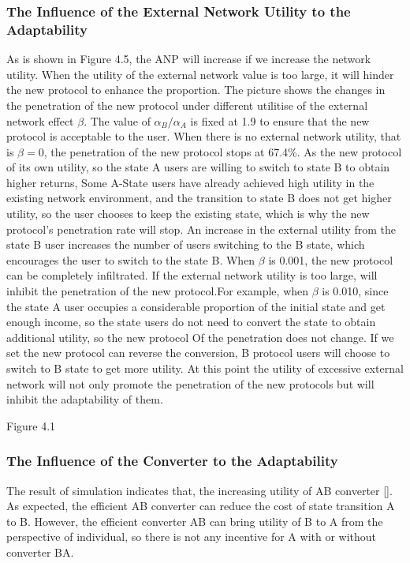 \documentclass{article}
\begin{document}
\subsubsection{The Influence of the External Network Utility to the Adaptability}
As is shown in Figure 4.5, the ANP will increase if we increase the network utility. When the utility of the external
network value is too large, it will hinder the new protocol to enhance the proportion. The picture shows the changes
in the penetration of the new protocol under different utilitise of the external network effect \(\beta\). The value of
$\alpha_{B}/\alpha_{A}$ is fixed at 1.9 to ensure that the new protocol is acceptable to the user. When there is no
external network utility, that is $\beta=0$, the penetration of the new protocol stops at 67.4\%. As the new protocol
of its own utility, so the state A users are willing to switch to state B to obtain higher returns, Some A-State users
have already achieved high utility in the existing network environment, and the transition to state B does not get higher
utility, so the user chooses to keep the existing state, which is why the new protocol's penetration rate will stop.
An increase in the external utility from the state B user increases the number of users switching to the B state, which
encourages the user to switch to the state B. When $\beta$ is 0.001, the new protocol can be completely infiltrated. If
the external network utility is too large, will inhibit the penetration of the new protocol.For example, when $\beta$ is
0.010, since the state A user occupies a considerable proportion of the initial state and get enough income, so the state
users do not need to convert the state to obtain additional utility, so the new protocol Of the penetration does not
change. If we set the new protocol can reverse the conversion, B protocol users will choose to switch to B state to get
more utility. At this point the utility of excessive external network will not only promote the penetration of the new
protocols but will inhibit the adaptability of them.

Figure 4.1

\subsubsection{The Influence of the Converter to the Adaptability}
The result of simulation indicates that, the increasing utility of AB converter []. As expected, the efficient AB
converter can reduce the cost of state transition A to B. However, the efficient converter AB can bring utility of
B to A from the perspective of individual, so there is not any incentive for A with or without converter BA.
\end{document}
